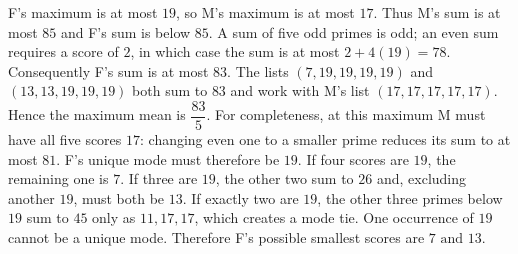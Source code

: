 F's maximum is at most $19$, so M's maximum is at most $17$. Thus M's sum is at most $85$ and F's sum is below $85$. A sum of five odd primes is odd; an even sum requires a score of $2$, in which case the sum is at most $2+4(19)=78$. Consequently F's sum is at most $83$.
The lists $(7,19,19,19,19)$ and $(13,13,19,19,19)$ both sum to $83$ and work with M's list $(17,17,17,17,17)$. Hence the maximum mean is $\dfrac{83}{5}$.
For completeness, at this maximum M must have all five scores $17$: changing even one to a smaller prime reduces its sum to at most $81$. F's unique mode must therefore be $19$. If four scores are $19$, the remaining one is $7$. If three are $19$, the other two sum to $26$ and, excluding another $19$, must both be $13$. If exactly two are $19$, the other three primes below $19$ sum to $45$ only as $11,17,17$, which creates a mode tie. One occurrence of $19$ cannot be a unique mode. Therefore F's possible smallest scores are $\boxed{7\text{ and }13}$.
